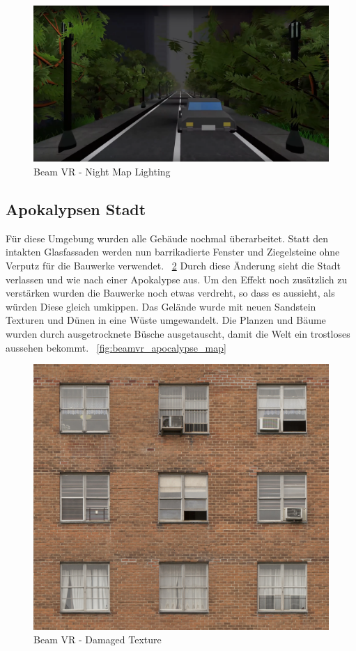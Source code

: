 \begin {figure}
    \centering
    \includegraphics[scale=0.3]{pics/beamvr_night_overview}
    \caption{Beam VR - Night Map Lighting}
    \label{fig:beamvr_night_map_lighting}
\end {figure}

\subsection{Apokalypsen Stadt}\label{subsec:apocalypse-city}
F\"ur diese Umgebung wurden alle Geb\"aude nochmal \"uberarbeitet.
Statt den intakten Glasfassaden werden nun barrikadierte Fenster und Ziegelsteine ohne Verputz f\"ur die Bauwerke verwendet.
~\ref{fig:beamvr_damaged_texture}
Durch diese \"Anderung sieht die Stadt verlassen und wie nach einer Apokalypse aus.
Um den Effekt noch zus\"atzlich zu verst\"arken wurden die Bauwerke noch etwas verdreht, so dass es aussieht, als w\"urden Diese gleich umkippen.
Das Gel\"ande wurde mit neuen Sandstein Texturen und D\"unen in eine W\"uste umgewandelt.
Die Planzen und B\"aume wurden durch ausgetrocknete B\"usche ausgetauscht, damit die Welt ein trostloses aussehen bekommt.
~\ref{fig:beamvr_apocalypse_map}

\begin {figure}
    \centering
    \includegraphics{pics/beamvr_damaged_texture}
    \caption{Beam VR - Damaged Texture}
    \label{fig:beamvr_damaged_texture}
\end {figure}

